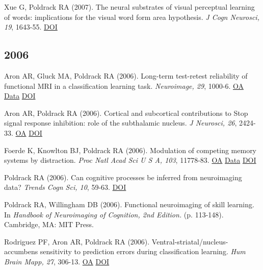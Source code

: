 \documentclass[10pt, letterpaper]{article}
\begin{document}
Xue G, Poldrack RA (2007). The neural substrates of visual perceptual learning of words: implications for the visual word form area hypothesis. \textit{J Cogn Neurosci, 19}, 1643-55. \href{http://dx.doi.org/10.1162/jocn.2007.19.10.1643}{DOI} \vspace{2mm}

\subsection*{2006}Aron AR, Gluck MA, Poldrack RA (2006). Long-term test-retest reliability of functional MRI in a classification learning task. \textit{Neuroimage, 29}, 1000-6. \href{https://www.ncbi.nlm.nih.gov/pmc/articles/PMC1630684}{OA} \href{https://openneuro.org/datasets/ds000017/versions/00001}{Data} \href{http://dx.doi.org/10.1016/j.neuroimage.2005.08.010}{DOI} \vspace{2mm}

Aron AR, Poldrack RA (2006). Cortical and subcortical contributions to Stop signal response inhibition: role of the subthalamic nucleus. \textit{J Neurosci, 26}, 2424-33. \href{https://www.ncbi.nlm.nih.gov/pmc/articles/PMC6793670}{OA} \href{http://dx.doi.org/10.1523/jneurosci.4682-05.2006}{DOI} \vspace{2mm}

Foerde K, Knowlton BJ, Poldrack RA (2006). Modulation of competing memory systems by distraction. \textit{Proc Natl Acad Sci U S A, 103}, 11778-83. \href{https://www.ncbi.nlm.nih.gov/pmc/articles/PMC1544246}{OA} \href{https://openneuro.org/datasets/ds000011/versions/00001}{Data} \href{http://dx.doi.org/10.1073/pnas.0602659103}{DOI} \vspace{2mm}

Poldrack RA (2006). Can cognitive processes be inferred from neuroimaging data? \textit{Trends Cogn Sci, 10}, 59-63. \href{http://dx.doi.org/10.1016/j.tics.2005.12.004}{DOI} \vspace{2mm}

Poldrack RA, Willingham DB (2006). Functional neuroimaging of skill learning. In \textit{Handbook of Neuroimaging of Cognition, 2nd Edition.} (p. 113-148). Cambridge, MA: MIT Press. \vspace{2mm}

Rodriguez PF, Aron AR, Poldrack RA (2006). Ventral-striatal/nucleus-accumbens sensitivity to prediction errors during classification learning. \textit{Hum Brain Mapp, 27}, 306-13. \href{https://www.ncbi.nlm.nih.gov/pmc/articles/PMC6871483}{OA} \href{http://dx.doi.org/10.1002/hbm.20186}{DOI} \vspace{2mm}
\end{document}
